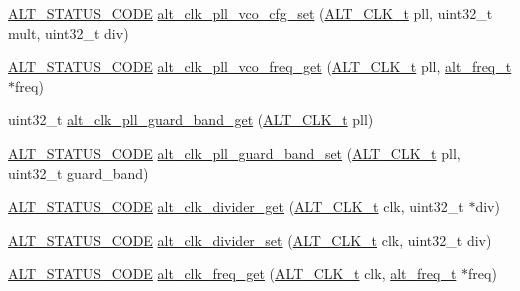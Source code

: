 \begin{DoxyCompactItemize}
\item 
\mbox{\hyperlink{hwlib_8h_abdb0d369f069723ca55d6c94bcaaaa12}{A\+L\+T\+\_\+\+S\+T\+A\+T\+U\+S\+\_\+\+C\+O\+DE}} \mbox{\hyperlink{group__CLK__MGR__FREQ_gaa5d2fed410c91e8944e1855c4c06217b}{alt\+\_\+clk\+\_\+pll\+\_\+vco\+\_\+cfg\+\_\+set}} (\mbox{\hyperlink{group__CLK__MGR_ga4cdb80e84284365fe3d47c2f8050b13d}{A\+L\+T\+\_\+\+C\+L\+K\+\_\+t}} pll, uint32\+\_\+t mult, uint32\+\_\+t div)
\item 
\mbox{\hyperlink{hwlib_8h_abdb0d369f069723ca55d6c94bcaaaa12}{A\+L\+T\+\_\+\+S\+T\+A\+T\+U\+S\+\_\+\+C\+O\+DE}} \mbox{\hyperlink{group__CLK__MGR__FREQ_gafe0d2090a9d71d54851d9968d9cf023e}{alt\+\_\+clk\+\_\+pll\+\_\+vco\+\_\+freq\+\_\+get}} (\mbox{\hyperlink{group__CLK__MGR_ga4cdb80e84284365fe3d47c2f8050b13d}{A\+L\+T\+\_\+\+C\+L\+K\+\_\+t}} pll, \mbox{\hyperlink{group__CLK__MGR_gaa32fe6dfaa6def16098e0039eb336383}{alt\+\_\+freq\+\_\+t}} $\ast$freq)
\item 
uint32\+\_\+t \mbox{\hyperlink{group__CLK__MGR__FREQ_gac5a0f7ee1a6e85fea537936470f7b850}{alt\+\_\+clk\+\_\+pll\+\_\+guard\+\_\+band\+\_\+get}} (\mbox{\hyperlink{group__CLK__MGR_ga4cdb80e84284365fe3d47c2f8050b13d}{A\+L\+T\+\_\+\+C\+L\+K\+\_\+t}} pll)
\item 
\mbox{\hyperlink{hwlib_8h_abdb0d369f069723ca55d6c94bcaaaa12}{A\+L\+T\+\_\+\+S\+T\+A\+T\+U\+S\+\_\+\+C\+O\+DE}} \mbox{\hyperlink{group__CLK__MGR__FREQ_gafc048f06e4287620cf70b639fbce8f6d}{alt\+\_\+clk\+\_\+pll\+\_\+guard\+\_\+band\+\_\+set}} (\mbox{\hyperlink{group__CLK__MGR_ga4cdb80e84284365fe3d47c2f8050b13d}{A\+L\+T\+\_\+\+C\+L\+K\+\_\+t}} pll, uint32\+\_\+t guard\+\_\+band)
\item 
\mbox{\hyperlink{hwlib_8h_abdb0d369f069723ca55d6c94bcaaaa12}{A\+L\+T\+\_\+\+S\+T\+A\+T\+U\+S\+\_\+\+C\+O\+DE}} \mbox{\hyperlink{group__CLK__MGR__FREQ_ga0ecbfb80ce5b08c0791495714c03572b}{alt\+\_\+clk\+\_\+divider\+\_\+get}} (\mbox{\hyperlink{group__CLK__MGR_ga4cdb80e84284365fe3d47c2f8050b13d}{A\+L\+T\+\_\+\+C\+L\+K\+\_\+t}} clk, uint32\+\_\+t $\ast$div)
\item 
\mbox{\hyperlink{hwlib_8h_abdb0d369f069723ca55d6c94bcaaaa12}{A\+L\+T\+\_\+\+S\+T\+A\+T\+U\+S\+\_\+\+C\+O\+DE}} \mbox{\hyperlink{group__CLK__MGR__FREQ_gacc6ad7e34ab9ccd14cd78291553f9f9b}{alt\+\_\+clk\+\_\+divider\+\_\+set}} (\mbox{\hyperlink{group__CLK__MGR_ga4cdb80e84284365fe3d47c2f8050b13d}{A\+L\+T\+\_\+\+C\+L\+K\+\_\+t}} clk, uint32\+\_\+t div)
\item 
\mbox{\hyperlink{hwlib_8h_abdb0d369f069723ca55d6c94bcaaaa12}{A\+L\+T\+\_\+\+S\+T\+A\+T\+U\+S\+\_\+\+C\+O\+DE}} \mbox{\hyperlink{group__CLK__MGR__FREQ_gacaada7e77622ae0445ee3f3dabb13274}{alt\+\_\+clk\+\_\+freq\+\_\+get}} (\mbox{\hyperlink{group__CLK__MGR_ga4cdb80e84284365fe3d47c2f8050b13d}{A\+L\+T\+\_\+\+C\+L\+K\+\_\+t}} clk, \mbox{\hyperlink{group__CLK__MGR_gaa32fe6dfaa6def16098e0039eb336383}{alt\+\_\+freq\+\_\+t}} $\ast$freq)
\end{DoxyCompactItemize}



